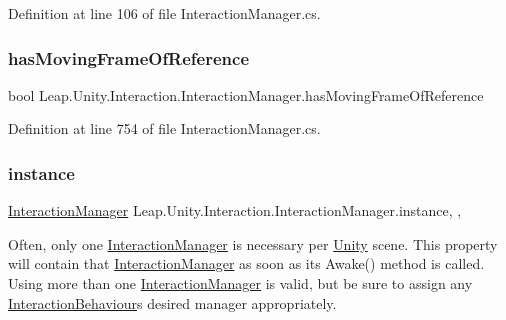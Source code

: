 Definition at line 106 of file Interaction\+Manager.\+cs.

\mbox{\label{class_leap_1_1_unity_1_1_interaction_1_1_interaction_manager_aadad63856353238fd977cb228cd7f6bf}} 
\subsubsection{\texorpdfstring{hasMovingFrameOfReference}{hasMovingFrameOfReference}}
{\footnotesize\ttfamily bool Leap.\+Unity.\+Interaction.\+Interaction\+Manager.\+has\+Moving\+Frame\+Of\+Reference\hspace{0.3cm}{\ttfamily [get]}}



Definition at line 754 of file Interaction\+Manager.\+cs.

\mbox{\label{class_leap_1_1_unity_1_1_interaction_1_1_interaction_manager_ad59361bc7c0cc65f18f0c9b9b0fac587}} 
\subsubsection{\texorpdfstring{instance}{instance}}
{\footnotesize\ttfamily \mbox{\hyperlink{class_leap_1_1_unity_1_1_interaction_1_1_interaction_manager}{Interaction\+Manager}} Leap.\+Unity.\+Interaction.\+Interaction\+Manager.\+instance\hspace{0.3cm}{\ttfamily [static]}, {\ttfamily [get]}, {\ttfamily [set]}}



Often, only one \mbox{\hyperlink{class_leap_1_1_unity_1_1_interaction_1_1_interaction_manager}{Interaction\+Manager}} is necessary per \mbox{\hyperlink{namespace_leap_1_1_unity}{Unity}} scene. This property will contain that \mbox{\hyperlink{class_leap_1_1_unity_1_1_interaction_1_1_interaction_manager}{Interaction\+Manager}} as soon as its Awake() method is called. Using more than one \mbox{\hyperlink{class_leap_1_1_unity_1_1_interaction_1_1_interaction_manager}{Interaction\+Manager}} is valid, but be sure to assign any \mbox{\hyperlink{class_leap_1_1_unity_1_1_interaction_1_1_interaction_behaviour}{Interaction\+Behaviour}}\textquotesingle{}s desired manager appropriately. 

